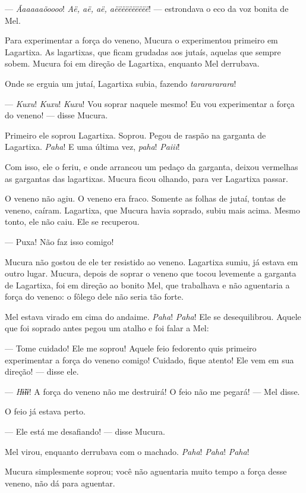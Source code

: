 --- \textit{Ãaaaaaõoooo}! \textit{Aë, aë, aë, aëëëëëëëëëë}! --- estrondava o eco da voz bonita de Mel. 

Para experimentar a força do veneno, Mucura o experimentou primeiro em
Lagartixa. As lagartixas, que ficam grudadas aos jutaís, aquelas que
sempre sobem. Mucura foi em direção de Lagartixa, enquanto Mel
derrubava. 

Onde se erguia um jutaí, Lagartixa subia, fazendo \textit{tararararara}! 

--- \textit{Kuxu}! \textit{Kuxu}! \textit{Kuxu}! Vou soprar naquele mesmo! Eu vou experimentar a força do veneno! --- disse Mucura. 

Primeiro ele soprou Lagartixa. Soprou. Pegou de raspão na garganta de
Lagartixa. \textit{Paha}! E uma última vez, \textit{paha}! \textit{Paiii}!

Com isso, ele o feriu, e onde arrancou um pedaço da garganta, deixou
vermelhas as gargantas das lagartixas. Mucura ficou olhando, para ver
Lagartixa passar. 

O veneno não agiu. O veneno era fraco. Somente as folhas de jutaí,
 tontas de veneno, caíram. Lagartixa, que Mucura havia soprado, subiu
 mais acima. Mesmo tonto, ele não caiu. Ele se recuperou.

--- Puxa! Não faz isso comigo! 

Mucura não gostou de ele ter resistido ao veneno. Lagartixa sumiu, já
estava em outro lugar. Mucura, depois de soprar o veneno que tocou
levemente a garganta de Lagartixa, foi em direção ao bonito Mel, que
trabalhava e não aguentaria a força do veneno: o fôlego dele não seria
tão forte. 

Mel estava virado em cima do andaime. \textit{Paha}! \textit{Paha}! Ele se
desequilibrou. Aquele que foi soprado antes pegou um atalho e foi falar
a Mel: 

--- Tome cuidado! Ele me soprou! Aquele feio fedorento quis primeiro
experimentar a força do veneno comigo! Cuidado, fique atento! Ele vem em
sua direção! --- disse ele. 

--- \textit{Hɨ̃ɨɨ}! A força do veneno não me destruirá! O feio não me
pegará! --- Mel disse. 

O feio já estava perto.

--- Ele está me desafiando! --- disse Mucura. 

Mel virou, enquanto derrubava com o machado. \textit{Paha}! \textit{Paha}! \textit{Paha}!

Mucura simplesmente soprou; você não aguentaria muito tempo a força
desse veneno, não dá para aguentar. 

